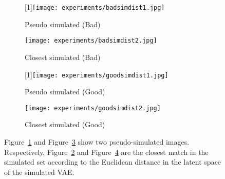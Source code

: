
\begin{figure}[h]
  \centering
  \begin{subfigure}{.24\linewidth}
	      \centering
	      \scalebox{-1}[1]{\texttt{[image: experiments/badsimdist1.jpg]}}
	      \caption{Pseudo simulated (Bad)}\label{fig:badsimdist1}
	  \end{subfigure}%
  \hfill
  \begin{subfigure}{.24\linewidth}
	    \centering
	    \texttt{[image: experiments/badsimdist2.jpg]}
	    \caption{Closest simulated (Bad)}\label{fig:badsimdist2}
	  \end{subfigure}%
  \hfill
  \begin{subfigure}{.24\linewidth}
	      \centering
	      \scalebox{-1}[1]{\texttt{[image: experiments/goodsimdist1.jpg]}}
	      \caption{Pseudo simulated (Good)}\label{fig:goodsimdist1}
	  \end{subfigure}%
  \hfill
  \begin{subfigure}{.24\linewidth}
	    \centering
	    \texttt{[image: experiments/goodsimdist2.jpg]}
	    \caption{Closest simulated (Good)}\label{fig:goodsimdist2}
	\end{subfigure}
	  \caption{Figure~\ref{fig:badsimdist1} and Figure~\ref{fig:goodsimdist1} show two pseudo-simulated images. Respectively, Figure~\ref{fig:badsimdist2} and Figure~\ref{fig:goodsimdist2} are the closest match in the simulated set according to the Euclidean distance in the latent space of the simulated VAE.}
	  \label{fig:simdistance}
\end{figure}


